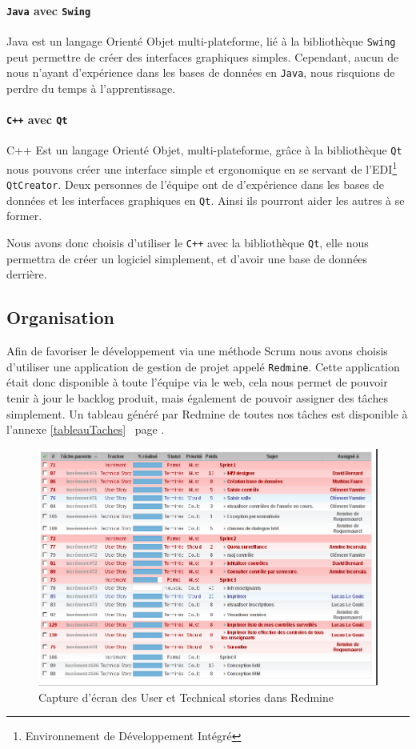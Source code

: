 		\paragraph{\texttt{Java} avec \texttt{Swing}} Java est un langage Orienté Objet multi-plateforme, lié à la bibliothèque \texttt{Swing} peut 
		permettre de créer des interfaces graphiques simples. Cependant, aucun de nous n'ayant d'expérience dans les bases de données
		en \texttt{Java}, nous risquions de perdre du temps à l'apprentissage.
		\paragraph{\texttt{C++} avec \texttt{Qt}} C++ Est un langage Orienté Objet, multi-plateforme, grâce à la bibliothèque \texttt{Qt} nous 
		pouvons créer une interface simple et ergonomique en se servant de l'EDI\footnote{Environnement de Développement Intégré} \texttt{QtCreator}. 
		Deux personnes de l'équipe ont de d'expérience dans les bases de données et les interfaces graphiques en \texttt{Qt}. Ainsi
		ils pourront aider les autres à se former. 

		Nous avons donc choisis d'utiliser le \texttt{C++} avec la bibliothèque \texttt{Qt}, elle nous permettra de créer un logiciel simplement,
		et d'avoir une base de données derrière.
	\subsection{Organisation}
		Afin de favoriser le développement via une méthode Scrum nous avons choisis d'utiliser une application de gestion de projet
		appelé \texttt{Redmine}. 
		Cette application était donc disponible à toute l'équipe via le web, cela nous permet de pouvoir tenir à jour le backlog produit, mais également
		de pouvoir assigner des tâches simplement. 
		Un tableau généré par Redmine de toutes nos tâches est disponible à l'annexe  \ref{tableauTaches}  page \pageref{tableauTaches}.
		\begin{figure}[H]
			\begin{center}
				\includegraphics[width=17.5cm]{images/screenRedmine.png}
			\end{center}
			\caption{Capture d'écran des User et Technical stories dans Redmine}
		\end{figure}


